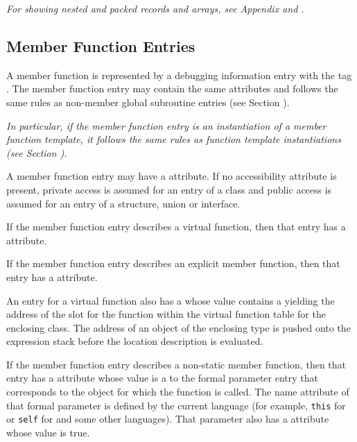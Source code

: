 \textit{For showing nested and packed records and arrays, 
see Appendix  and 
.}


\subsection{Member Function Entries}
\label{chap:memberfunctionentries}

A member function is represented by a 
debugging information entry 
with the 
tag \DWTAGsubprogram.
The member function entry
may contain the same attributes and follows the same rules
as non-member global subroutine entries 
(see Section ).

\textit{In particular, if the member function entry is an
instantiation of a member function template, it follows the 
same rules as function template instantiations (see Section 
).
}

A member function entry may have a 
\hyperlink{chap:DWATaccessibilityattribute}{\DWATaccessibilityNAME}
attribute. If no accessibility attribute is present, private
access is assumed for an entry of a class and public access
is assumed for an entry of a structure, union or interface.

If the member function entry describes a virtual function,
then that entry has a
\bb
\hyperlink{chap:DWATvirtualityvirtualityindication}{\DWATvirtualityNAME} 
\eb
attribute.

If\hypertarget{chap:DWATexplicitexplicitpropertyofmemberfunction}{}
the member function entry describes an explicit member
function, then that entry has 
a 
\DWATexplicitDEFN{} attribute.

An\hypertarget{chap:DWATvtableelemlocationvirtualfunctiontablevtableslot}{}
entry for a virtual function also has a
\DWATvtableelemlocationDEFN{}
 whose value contains
a  
yielding the address of the slot
for the function within the virtual function table for the
enclosing class. The address of an object of the enclosing
type is pushed onto the expression stack before the location
description is evaluated.

If\hypertarget{chap:DWATobjectpointerobjectthisselfpointerofmemberfunction}{}
the member function entry describes a non-static member
function, then that entry 
has 
a \DWATobjectpointerDEFN{} attribute
whose value is a  
to the formal parameter entry
that corresponds to the object for which the function is
called. The name attribute of that formal parameter is defined
by the current language (for example, 
\texttt{this} for  or \texttt{self}
for  
and some other languages). That parameter
also has a \DWATartificial{} attribute whose value is true.

